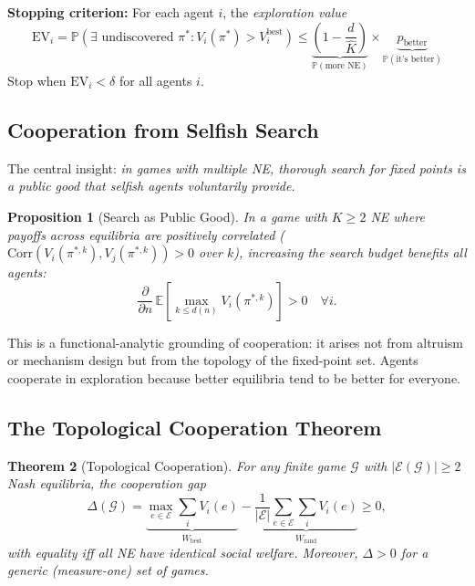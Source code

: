 \documentclass[11pt,a4paper]{article}
\newtheorem{theorem}{Theorem}[section]
\newtheorem{proposition}[theorem]{Proposition}
\newcommand{\E}{\mathbb{E}}
\newcommand{\Prob}{\mathbb{P}}
\begin{document}
\textbf{Stopping criterion:} For each agent $i$, the \emph{exploration value}
\begin{equation}
    \text{EV}_i = \Prob(\exists \text{ undiscovered } \pi^* : V_i(\pi^*) > V_i^{\text{best}})
    \leq \underbrace{\left(1 - \frac{d}{\hat{K}}\right)}_{\Prob(\text{more NE})}
    \times \underbrace{p_{\text{better}}}_{\Prob(\text{it's better})}
\end{equation}
Stop when $\text{EV}_i < \delta$ for all agents $i$.

\subsection{Cooperation from Selfish Search}

The central insight: \emph{in games with multiple NE, thorough search for
fixed points is a public good that selfish agents voluntarily provide.}

\begin{proposition}[Search as Public Good]\label{prop:public-good}
In a game with $K \geq 2$ NE where payoffs across equilibria are
positively correlated ($\text{Corr}(V_i(\pi^{*,k}), V_j(\pi^{*,k})) > 0$
over $k$), increasing the search budget benefits all agents:
\[
    \frac{\partial}{\partial n}\, \E\!\left[\max_{k \leq d(n)} V_i(\pi^{*,k})\right] > 0
    \quad \forall i.
\]
\end{proposition}

This is a functional-analytic grounding of cooperation: it arises not
from altruism or mechanism design but from the topology of the
fixed-point set. Agents cooperate in exploration because better
equilibria tend to be better for everyone.

\subsection{The Topological Cooperation Theorem}

\begin{theorem}[Topological Cooperation]\label{thm:topo-coop}
For any finite game $\mathcal{G}$ with $|\mathcal{E}(\mathcal{G})| \geq 2$
Nash equilibria, the cooperation gap
\begin{equation}
    \Delta(\mathcal{G}) = \underbrace{\max_{e \in \mathcal{E}} \sum_i V_i(e)}_{W_{\text{best}}}
    - \underbrace{\frac{1}{|\mathcal{E}|}\sum_{e \in \mathcal{E}} \sum_i V_i(e)}_{W_{\text{rand}}}
    \geq 0,
\end{equation}
with equality iff all NE have identical social welfare. Moreover,
$\Delta > 0$ for a generic (measure-one) set of games.
\end{theorem}
\end{document}
